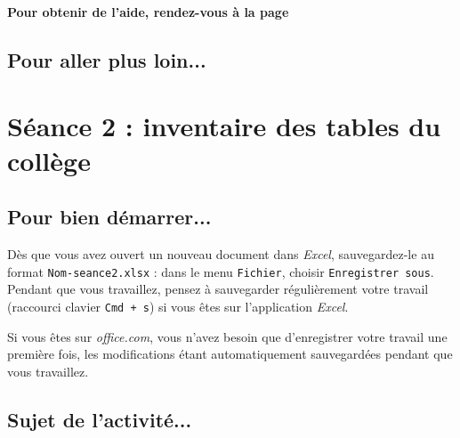 \textbf{Pour obtenir de l'aide, rendez-vous à la page \pageref{Tableur5eOutils}}





\subsection{Pour aller plus loin...}

\vfill
\phantom{rien}




%
%
%
%



\section{Séance 2 : inventaire des tables du collège}\label{ficheTableur5e2}

\subsection{Pour bien démarrer...}

Dès que vous avez ouvert un nouveau document dans \emph{Excel}, sauvegardez-le au format \texttt{Nom-seance2.xlsx} : dans le menu \texttt{Fichier}, choisir \texttt{Enregistrer sous}. Pendant que vous travaillez, pensez à sauvegarder régulièrement votre travail (raccourci clavier \texttt{Cmd + s}) si vous êtes sur l'application \emph{Excel}.


Si vous êtes sur \emph{office.com}, vous n'avez besoin que d'enregistrer votre travail une première fois, les modifications étant automatiquement sauvegardées pendant que vous travaillez.


\subsection{Sujet de l'activité...}

\vspace{10pt}

